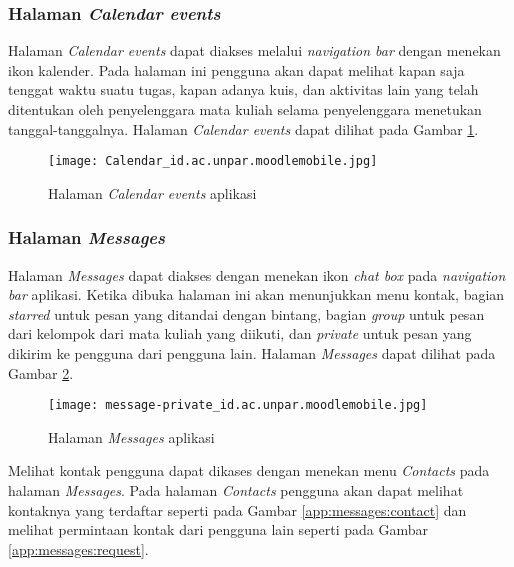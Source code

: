 \subsubsection{Halaman \textit{Calendar events}}

Halaman \textit{Calendar events} dapat diakses melalui \textit{navigation bar} dengan menekan ikon kalender. Pada halaman ini pengguna akan dapat melihat kapan saja tenggat waktu suatu tugas, kapan adanya kuis, dan aktivitas lain yang telah ditentukan oleh penyelenggara mata kuliah selama penyelenggara menetukan tanggal-tanggalnya. Halaman \textit{Calendar events} dapat dilihat pada Gambar \ref{app:calendar}.

\begin{figure}[H] 
	\centering  
	\texttt{[image: Calendar\_id.ac.unpar.moodlemobile.jpg]}  
	\caption[Halaman \textit{Calendar events} aplikasi] {Halaman \textit{Calendar events} aplikasi} 
	\label{app:calendar} 
\end{figure}  

\subsubsection{Halaman \textit{Messages}}

Halaman \textit{Messages} dapat diakses dengan menekan ikon \textit{chat box} pada \textit{navigation bar} aplikasi. Ketika dibuka halaman ini akan menunjukkan menu kontak, bagian \textit{starred} untuk pesan yang ditandai dengan bintang, bagian \textit{group} untuk pesan dari kelompok dari mata kuliah yang diikuti, dan \textit{private} untuk pesan yang dikirim ke pengguna dari pengguna lain. Halaman \textit{Messages} dapat dilihat pada Gambar \ref{app:messages}.


\begin{figure}[H] 
	\centering  
	\texttt{[image: message-private\_id.ac.unpar.moodlemobile.jpg]}  
	\caption[Halaman \textit{Messages} aplikasi] {Halaman \textit{Messages} aplikasi} 
	\label{app:messages} 
\end{figure}  

Melihat kontak pengguna dapat dikases dengan menekan menu \textit{Contacts} pada halaman \textit{Messages}. Pada halaman \textit{Contacts} pengguna akan dapat melihat kontaknya yang terdaftar seperti pada Gambar \ref{app:messages:contact} dan melihat permintaan kontak dari pengguna lain seperti pada Gambar \ref{app:messages:request}.


